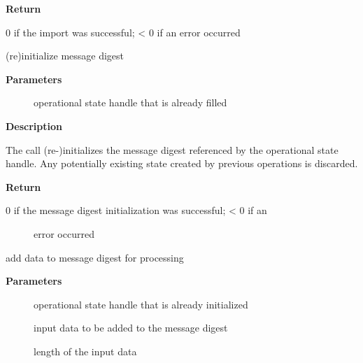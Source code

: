 \documentclass[a4paper,8pt,english]{sphinxmanual}
\begin{document}
\textbf{Return}

0 if the import was successful; \textless{} 0 if an error occurred

\begin{fulllineitems}
\label{crypto/api-digest:c.crypto_shash_init}
(re)initialize message digest

\end{fulllineitems}


\textbf{Parameters}
\begin{description}
\item[{}] \leavevmode
operational state handle that is already filled

\end{description}

\textbf{Description}

The call (re-)initializes the message digest referenced by the
operational state handle. Any potentially existing state created by
previous operations is discarded.

\textbf{Return}
\begin{description}
\item[{0 if the message digest initialization was successful; \textless{} 0 if an}] \leavevmode
error occurred

\end{description}

\begin{fulllineitems}
\label{crypto/api-digest:c.crypto_shash_update}
add data to message digest for processing

\end{fulllineitems}


\textbf{Parameters}
\begin{description}
\item[{}] \leavevmode
operational state handle that is already initialized

\item[{}] \leavevmode
input data to be added to the message digest

\item[{}] \leavevmode
length of the input data

\end{description}
\end{document}
